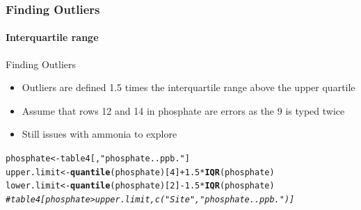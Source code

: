 \documentclass[12pt]{beamer}\usepackage[]{graphicx}\usepackage[]{color}
\makeatletter
\newcommand{\hlnum}[1]{\textcolor[rgb]{0.686,0.059,0.569}{#1}}%
\newcommand{\hlstr}[1]{\textcolor[rgb]{0.192,0.494,0.8}{#1}}%
\newcommand{\hlcom}[1]{\textcolor[rgb]{0.678,0.584,0.686}{\textit{#1}}}%
\newcommand{\hlopt}[1]{\textcolor[rgb]{0,0,0}{#1}}%
\newcommand{\hlstd}[1]{\textcolor[rgb]{0.345,0.345,0.345}{#1}}%
\newcommand{\hlkwb}[1]{\textcolor[rgb]{0.69,0.353,0.396}{#1}}%
\newcommand{\hlkwd}[1]{\textcolor[rgb]{0.737,0.353,0.396}{\textbf{#1}}}%
\newenvironment{kframe}{%
 \def\at@end@of@kframe{}%
 \ifinner\ifhmode%
  \def\at@end@of@kframe{\end{minipage}}%
  \begin{minipage}{\columnwidth}%
 \fi\fi%
 \def\FrameCommand##1{\hskip\@totalleftmargin \hskip-\fboxsep
 \colorbox{shadecolor}{##1}\hskip-\fboxsep
     \hskip-\linewidth \hskip-\@totalleftmargin \hskip\columnwidth}%
 \MakeFramed {\advance\hsize-\width
   \@totalleftmargin\z@ \linewidth\hsize
   \@setminipage}}%
 {\par\unskip\endMakeFramed%
 \at@end@of@kframe}
\newenvironment{knitrout}{}{} %
\makeatother
\begin{document}
\begin{frame}[fragile]
  \frametitle{Finding Outliers}
  \framesubtitle{Interquartile range}
  \begin{block}{Finding Outliers}
  \begin{itemize}
  \item Outliers are defined 1.5 times the interquartile range above the upper quartile
  \item Assume that  rows 12 and 14 in phosphate are errors as the 9 is typed twice
  \item Still issues with ammonia to explore
  \end{itemize} 
   \end{block}   
\begin{knitrout}
\color{fgcolor}\begin{kframe}
\begin{alltt}
 \hlstd{phosphate}\hlkwb{<-}\hlstd{table4[,}\hlstr{"phosphate..ppb."}\hlstd{]}
 \hlstd{upper.limit} \hlkwb{<-} \hlkwd{quantile}\hlstd{(phosphate)[}\hlnum{4}\hlstd{]} \hlopt{+} \hlnum{1.5}\hlopt{*}\hlkwd{IQR}\hlstd{(phosphate)}
 \hlstd{lower.limit} \hlkwb{<-} \hlkwd{quantile}\hlstd{(phosphate)[}\hlnum{2}\hlstd{]} \hlopt{-} \hlnum{1.5}\hlopt{*}\hlkwd{IQR}\hlstd{(phosphate)}
 \hlcom{#table4[phosphate> upper.limit,c("Site","phosphate..ppb.")]}
\end{alltt}
\end{kframe}
\end{knitrout}
\end{frame}
\end{document}
